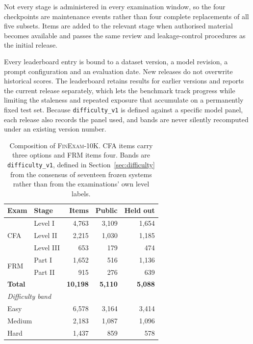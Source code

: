 Not every stage is administered in every examination window, so the four checkpoints are
maintenance events rather than four complete replacements of all five subsets. Items are added to
the relevant stage when authorised material becomes available and passes the same review and
leakage-control procedures as the initial release.

Every leaderboard entry is bound to a dataset version, a model revision, a prompt configuration
and an evaluation date. New releases do not overwrite historical scores. The leaderboard retains
results for earlier versions and reports the current release separately, which lets the benchmark
track progress while limiting the staleness and repeated exposure that accumulate on a
permanently fixed test set. Because \texttt{difficulty\_v1} is defined against a specific model
panel, each release also records the panel used, and bands are never silently recomputed under an
existing version number.

\begin{table}[t]
\centering\small
\begin{tabular}{llrrr}
\toprule
\textbf{Exam} & \textbf{Stage} & \textbf{Items} & \textbf{Public} & \textbf{Held out} \\
\midrule
\multirow{3}{*}{CFA} & Level I   & 4{,}763 & 3{,}109 & 1{,}654 \\
                     & Level II  & 2{,}215 & 1{,}030 & 1{,}185 \\
                     & Level III & 653     & 179     & 474 \\
\midrule
\multirow{2}{*}{FRM} & Part I    & 1{,}652 & 516     & 1{,}136 \\
                     & Part II   & 915     & 276     & 639 \\
\midrule
\multicolumn{2}{l}{\textbf{Total}} & \textbf{10{,}198} & \textbf{5{,}110} & \textbf{5{,}088} \\
\midrule
\multicolumn{2}{l}{\textit{Difficulty band}} & & & \\
\multicolumn{2}{l}{\quad Easy}   & 6{,}578 & 3{,}164 & 3{,}414 \\
\multicolumn{2}{l}{\quad Medium} & 2{,}183 & 1{,}087 & 1{,}096 \\
\multicolumn{2}{l}{\quad Hard}   & 1{,}437 & 859     & 578 \\
\bottomrule
\end{tabular}
\caption{Composition of \textsc{FinExam-10K}. CFA items carry three options and FRM items four.
Bands are \texttt{difficulty\_v1}, defined in Section~\ref{sec:difficulty} from the consensus of
seventeen frozen systems rather than from the examinations' own level labels.}
\label{tab:composition}
\end{table}
